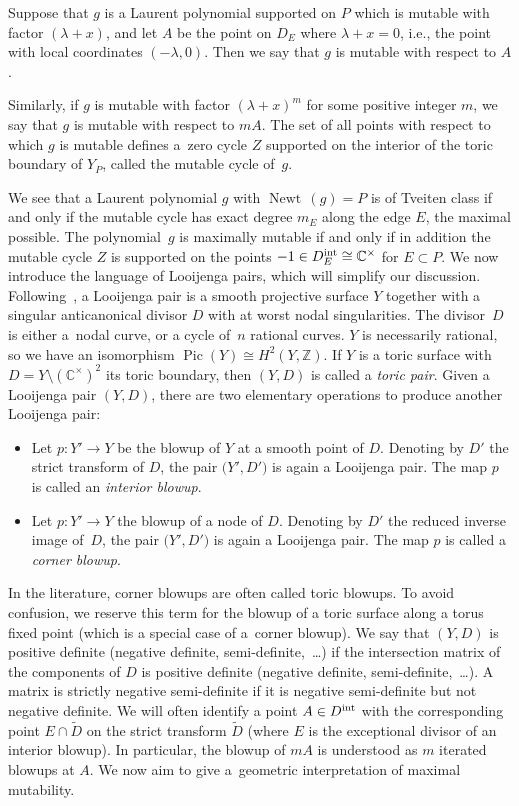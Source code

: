 \documentclass[pdftex]{sigma}
\numberwithin{equation}{section}
\DeclareMathOperator{\Newt}{{Newt \,}}
\DeclareMathOperator{\Pic}{{Pic}}
\newcommand{\CC}{\mathbb{C}}
\newcommand{\ZZ}{\mathbb{Z}}
\begin{document}
	\begin{Definition}\label{def:mutablecycle}
		Suppose that $g$ is a Laurent polynomial supported on $P$ which is mutable with factor $(\lambda +x)$, and let $A$ be the point on $D_E$ where $\lambda+x=0$, i.e., the point with local coordinates $(-\lambda, 0)$. Then we say that $g$ is mutable with respect to $A$.

		Similarly, if $g$ is mutable with factor $(\lambda+x)^m$ for some positive integer $m$, we say that $g$ is mutable with respect to $m A$.
		The set of all points with respect to which $g$ is mutable defines a~zero cycle $Z$ supported on the interior of the toric boundary of $Y_P$, called the mutable cycle of~$g$.
	\end{Definition}
	We see that a Laurent polynomial $g$ with $\Newt(g)=P$ is of Tveiten class if and only if the mutable cycle has exact degree $m_E$ along the edge $E$, the maximal possible. The polynomial~$g$ is maximally mutable if and only if in addition the mutable cycle $Z$ is supported on the points $-1 \in D_E^{\rm int} \cong \CC^\times$ for $E \subset P$.
We now introduce the language of Looijenga pairs, which will simplify our discussion.
Following~\cite{Friedman, GrossHackingKeelLooijengapairs}, a Looijenga pair is a smooth projective surface $Y$ together with a singular anticanonical divisor $D$ with at worst nodal singularities. The divisor~$D$ is either a~nodal curve, or a cycle of~$n$ rational curves. $Y$ is necessarily rational, so we have an isomorphism $\Pic(Y) \cong H^2(Y, \ZZ)$.
If $Y$ is a toric surface with $D=Y \setminus (\CC^\times)^2$ its toric boundary, then $(Y,D)$ is called a {\it toric pair}.
Given a Looijenga pair $(Y, D)$, there are two elementary operations to produce another Looijenga pair:
\begin{itemize}\itemsep=0pt
	\item
	Let $p \colon Y' \rightarrow Y$ be the blowup of $Y$ at a smooth point of $D$. Denoting by $D'$ the strict transform of $D$, the pair $\bigl(Y', D'\bigr)$ is again a Looijenga pair. The map $p$ is called an \emph{interior blowup}.
	\item
	Let $p \colon Y' \rightarrow Y$ the blowup of a node of $D$. Denoting by $D'$ the reduced inverse image of~$D$, the pair $\bigl(Y', D'\bigr)$ is again a Looijenga pair. The map $p$ is called a \emph{corner blowup}.
\end{itemize}
	In the literature, corner blowups are often called toric blowups. To avoid confusion, we reserve this term for the blowup of a toric surface along a torus fixed point (which is a special case of a~corner blowup).
	We say that $(Y, D)$ is positive definite (negative definite, semi-definite,~\dots) if the intersection matrix of the components of $D$ is positive definite (negative definite, semi-definite,~\dots). A matrix is strictly negative semi-definite if it is negative semi-definite but not negative definite.
We will often identify a point $A \in D^{\rm int}$ with the corresponding point $E \cap \tilde{D}$ on the strict transform $\tilde{D}$ (where $E$ is the exceptional divisor of an interior blowup). In particular, the blowup of $m A$ is understood as $m$ iterated blowups at $A$.
We now aim to give a~geometric interpretation of maximal mutability.
\end{document}
